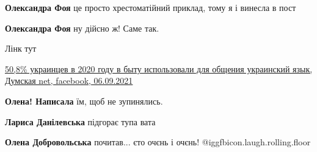 \begin{itemize}
{\begin{itemize}
{\textbf{Олександра Фоя} це просто хрестоматійний приклад, тому я і винесла в пост

 
\textbf{Олександра Фоя} ну дійсно ж! Саме так.
}\end{itemize}

 
Лінк тут

\href{https://www.facebook.com/205838236106547/posts/4827999290557062/}{%
50,8\% украинцев в 2020 году в быту использовали для общения украинский язык, %
Думская net, facebook, 06.09.2021%
}

\begin{itemize}{
 
\textbf{Олена! Написала} їм, щоб не зупинялись.

 
\textbf{Лариса Данілевська} підгорає тупа вата

 
\textbf{Олена Добровольська} почитав... єто очєнь і очєнь! @igg{fbicon.laugh.rolling.floor} 
}\end{itemize}

 
}
\end{itemize}
